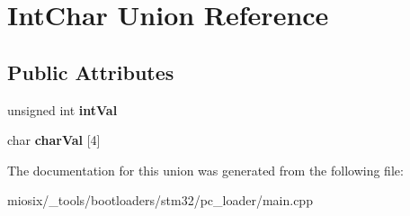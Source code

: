 \hypertarget{union_int_char}{\section{Int\-Char Union Reference}
\label{union_int_char}
}
\subsection*{Public Attributes}
\begin{DoxyCompactItemize}
\item 
\hypertarget{union_int_char_ab5c1db35d9579899b7d4aaee87ab5584}{unsigned int {\bfseries int\-Val}}\label{union_int_char_ab5c1db35d9579899b7d4aaee87ab5584}

\item 
\hypertarget{union_int_char_a062cd4ff7854bc84a4847837b63d95b5}{char {\bfseries char\-Val} \mbox{[}4\mbox{]}}\label{union_int_char_a062cd4ff7854bc84a4847837b63d95b5}

\end{DoxyCompactItemize}


The documentation for this union was generated from the following file\-:\begin{DoxyCompactItemize}
\item 
miosix/\-\_\-tools/bootloaders/stm32/pc\-\_\-loader/main.\-cpp\end{DoxyCompactItemize}
